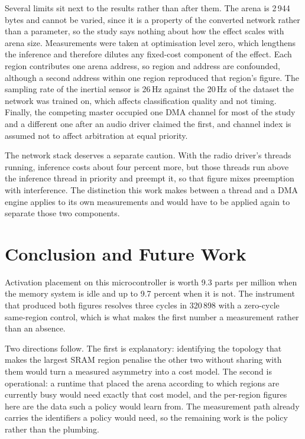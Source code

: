 \documentclass[conference]{IEEEtran}
\begin{document}
Several limits sit next to the results rather than after them. The arena
is 2\,944 bytes and cannot be varied, since it is a property of the
converted network rather than a parameter, so the study says nothing
about how the effect scales with arena size. Measurements were taken at
optimisation level zero, which lengthens the inference and therefore
dilutes any fixed-cost component of the effect. Each region contributes
one arena address, so region and address are confounded, although a
second address within one region reproduced that region's figure. The
sampling rate of the inertial sensor is 26\,Hz against the 20\,Hz of the
dataset the network was trained on, which affects classification quality
and not timing. Finally, the competing master occupied one DMA channel
for most of the study and a different one after an audio driver claimed
the first, and channel index is assumed not to affect arbitration at
equal priority.

The network stack deserves a separate caution. With the radio driver's
threads running, inference costs about four percent more, but those
threads run above the inference thread in priority and preempt it, so
that figure mixes preemption with interference. The distinction this work
makes between a thread and a DMA engine applies to its own measurements
and would have to be applied again to separate those two components.

\section{Conclusion and Future Work}

Activation placement on this microcontroller is worth 9.3 parts per
million when the memory system is idle and up to 9.7 percent when it is
not. The instrument that produced both figures resolves three cycles in
320\,898 with a zero-cycle same-region control, which is what makes the
first number a measurement rather than an absence.

Two directions follow. The first is explanatory: identifying the topology
that makes the largest SRAM region penalise the other two without
sharing with them would turn a measured asymmetry into a cost model. The
second is operational: a runtime that placed the arena according to which
regions are currently busy would need exactly that cost model, and the
per-region figures here are the data such a policy would learn from. The
measurement path already carries the identifiers a policy would need, so
the remaining work is the policy rather than the plumbing.
\end{document}
